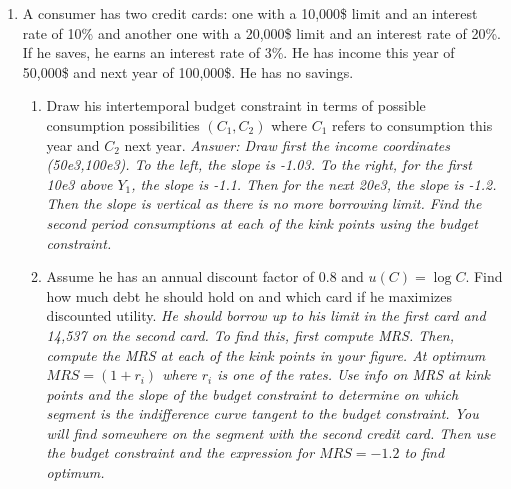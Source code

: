 \documentclass[11pt, oneside,french]{article}   	%
\begin{document}
\begin{enumerate}
  \item A consumer has two credit cards: one with a 10,000\$ limit and an interest rate of 10\% and another one with a 20,000\$ limit and an interest rate of 20\%. If he saves, he earns an interest rate of 3\%. He has income this year of 50,000\$ and next year of 100,000\$. He has no savings.
  \begin{enumerate}
  \item Draw his intertemporal budget constraint in terms of possible consumption possibilities $(C_1,C_2)$ where $C_1$ refers to consumption this year and $C_2$ next year. \textit{Answer: Draw first the income coordinates (50e3,100e3). To the left, the slope is -1.03. To the right, for the first 10e3 above $Y_1$, the slope is -1.1. Then for the next 20e3, the slope is -1.2. Then the slope is vertical as there is no more borrowing limit. Find the second period consumptions at each of the kink points using the budget constraint.} 
  \item Assume he has an annual discount factor of 0.8 and $u(C) = \log C$. Find how much debt he should hold on and which card if he maximizes discounted utility. \textit{He should borrow up to his limit in the first card and 14,537 on the second card. To find this, first compute MRS. Then, compute the MRS at each of the kink points in your figure. At optimum $MRS = (1+r_i)$ where $r_i$ is one of the rates. Use info on MRS at kink points and the slope of the budget constraint to determine on which segment is the indifference curve tangent to the budget constraint. You will find somewhere on the segment with the second credit card. Then use the budget constraint and the expression for $MRS = -1.2$ to find optimum. } 
  \end{enumerate}
\end{enumerate}
\end{document}

